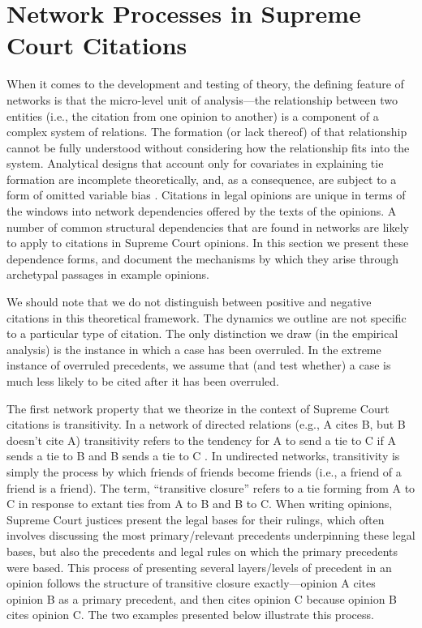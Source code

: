 \documentclass[headsepline=true, abstracton]{scrartcl}
\begin{document}
\section{Network Processes in Supreme Court Citations} 

When it comes to the development and testing of theory, the defining feature of networks is that the micro-level unit of analysis---the relationship between two entities (i.e., the citation from one opinion to another) is a component of a complex system of relations. The formation (or lack thereof) of that relationship cannot be fully understood without considering how the relationship fits into the system. Analytical designs that account only for covariates in explaining tie formation are incomplete theoretically, and, as a consequence, are subject to a form of omitted variable bias \citep{cranmer2016critique}. Citations in legal opinions are unique in terms of the windows into network dependencies offered by the texts of the opinions. A number of common structural dependencies that are found in networks are likely to apply to citations in Supreme Court opinions. In this section we present these dependence forms, and document the mechanisms by which they arise through archetypal passages in example opinions. 

We should note that we do not distinguish between positive and negative citations in this theoretical framework. The dynamics we outline are not specific to a particular type of citation. The only distinction we draw (in the empirical analysis) is the instance in which a case has been overruled. In the extreme instance of overruled precedents, we assume that (and test whether) a case is much less likely to be cited after it has been overruled.

The first network property that we theorize in the context of Supreme Court citations is transitivity. In a network of directed relations (e.g., A cites B, but B doesn't cite A) transitivity refers to the tendency for A to send a tie to C if A sends a tie to B and B sends a tie to C \citep{holland1971transitivity}. In undirected networks, transitivity is simply the process by which friends of friends become friends (i.e., a friend of a friend is a friend). The term, ``transitive closure'' refers to a tie forming from A to C in response to extant ties from A to B and B to C. When writing opinions, Supreme Court justices present the legal bases for their rulings, which often involves discussing the most primary/relevant precedents underpinning these legal bases, but also the precedents and legal rules on which the primary precedents were based. This process of presenting several layers/levels of precedent in an opinion follows the structure of transitive closure exactly---opinion A cites opinion B as a primary precedent, and then cites opinion C because opinion B cites opinion C. The two examples presented below illustrate this process.
\end{document}

